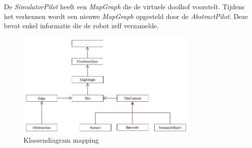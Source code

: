 \documentclass[eind]{penoverslag}
\begin{document}
De \textit{SimulatorPilot} heeft een \textit{MapGraph} die de virtuele doolhof voorstelt. Tijdens het verkennen wordt een nieuwe \textit{MapGraph} opgesteld door de \textit{AbstractPilot}. Deze bevat enkel informatie die de robot zelf verzamelde.

\begin{figure}[h!]
\centering
	\includegraphics[width=0.8\textwidth]{klasMapping}
\caption{Klassendiagram mapping}
\label{fig:klasMap}
\end{figure}

%
%
%
\end{document}
